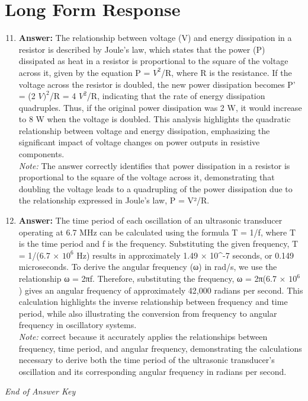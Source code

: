 \documentclass[12pt]{article}
\begin{document}
\section*{Long Form Response}
\begin{enumerate}[label=\arabic*.]
\setcounter{enumi}{10}
\item \textbf{Answer:} The relationship between voltage (V) and energy dissipation in a resistor is described by Joule's law, which states that the power (P) dissipated as heat in a resistor is proportional to the square of the voltage across it, given by the equation P = $V^2$/R, where R is the resistance. If the voltage across the resistor is doubled, the new power dissipation becomes P' = (2 $V)^2$/R = 4 $V^2$/R, indicating that the rate of energy dissipation quadruples. Thus, if the original power dissipation was 2 W, it would increase to 8 W when the voltage is doubled. This analysis highlights the quadratic relationship between voltage and energy dissipation, emphasizing the significant impact of voltage changes on power outputs in resistive components.
\\ \textit{Note:} The answer correctly identifies that power dissipation in a resistor is proportional to the square of the voltage across it, demonstrating that doubling the voltage leads to a quadrupling of the power dissipation due to the relationship expressed in Joule's law, P = V²/R.
\item \textbf{Answer:} The time period of each oscillation of an ultrasonic transducer operating at 6.7 MHz can be calculated using the formula T = 1/f, where T is the time period and f is the frequency. Substituting the given frequency, T = 1/(6.7 \ensuremath{\times} $10^6$ Hz) results in approximately 1.49 \ensuremath{\times} 10^-7 seconds, or 0.149 microseconds. To derive the angular frequency (ω) in rad/s, we use the relationship ω = 2πf. Therefore, substituting the frequency, ω = 2π(6.7 \ensuremath{\times} $10^6$) gives an angular frequency of approximately 42,000 radians per second. This calculation highlights the inverse relationship between frequency and time period, while also illustrating the conversion from frequency to angular frequency in oscillatory systems.
\\ \textit{Note:} correct because it accurately applies the relationships between frequency, time period, and angular frequency, demonstrating the calculations necessary to derive both the time period of the ultrasonic transducer's oscillation and its corresponding angular frequency in radians per second.
\end{enumerate}

\vfill
\noindent\textit{End of Answer Key}
\end{document}
